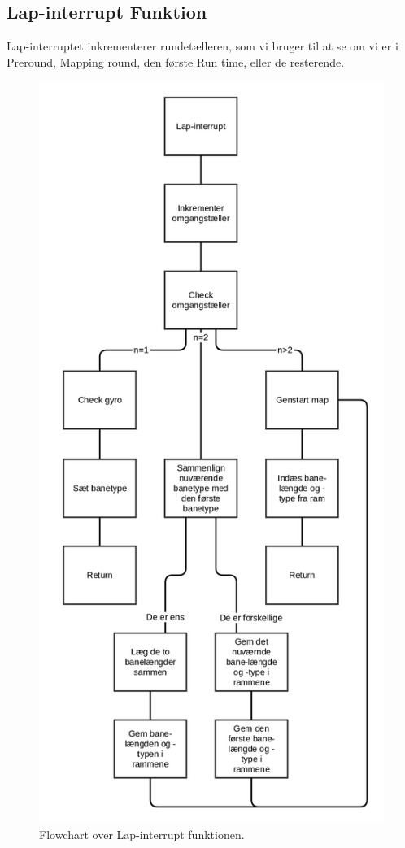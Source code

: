 \subsection{Lap-interrupt Funktion}

Lap-interruptet inkrementerer rundetælleren, som vi bruger til at se om vi er i Preround, Mapping round, den første Run time, eller de resterende.

\begin{figure}[H]
\centering
\includegraphics[scale=0.12]{Billeder/lap_interrupt.png}
\caption{Flowchart over Lap-interrupt funktionen.}
\label{fig:Lap Flowchart}
\end{figure}

